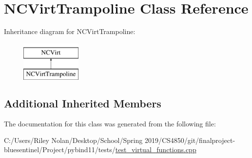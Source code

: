 \hypertarget{class_n_c_virt_trampoline}{}\section{N\+C\+Virt\+Trampoline Class Reference}
\label{class_n_c_virt_trampoline}
Inheritance diagram for N\+C\+Virt\+Trampoline\+:\begin{figure}[H]
\begin{center}
\leavevmode
\includegraphics[height=2.000000cm]{class_n_c_virt_trampoline}
\end{center}
\end{figure}
\subsection*{Additional Inherited Members}


The documentation for this class was generated from the following file\+:\begin{DoxyCompactItemize}
\item 
C\+:/\+Users/\+Riley Nolan/\+Desktop/\+School/\+Spring 2019/\+C\+S4850/git/finalproject-\/bluesentinel/\+Project/pybind11/tests/\mbox{\hyperlink{test__virtual__functions_8cpp}{test\+\_\+virtual\+\_\+functions.\+cpp}}\end{DoxyCompactItemize}
